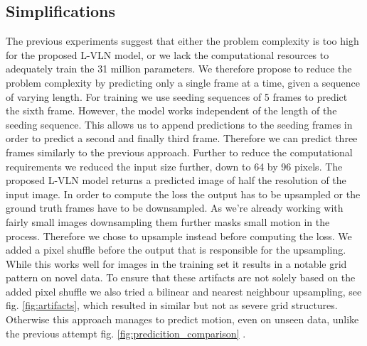 \documentclass[runningheads,a4paper]{llncs}
\begin{document}
\subsection{Simplifications}
The previous experiments suggest that either the problem complexity is too high for the proposed L-VLN model, or we lack the computational resources to adequately train the 31 million parameters. We therefore propose to reduce the problem complexity by predicting only a single frame at a time, given a sequence of varying length. For training we use seeding sequences of 5 frames to predict the sixth frame. However, the model works independent of the length of the seeding sequence. This allows us to append predictions to the seeding frames in order to predict a second and finally third frame. Therefore we can predict three frames similarly to the previous approach. Further to reduce the computational requirements we reduced the input size further, down to 64 by 96 pixels.
The proposed L-VLN model returns a predicted image of half the resolution of the input image. In order to compute the loss the output has to be upsampled or the ground truth frames have to be downsampled. As we’re already working with fairly small images downsampling them further masks small motion in the process. Therefore we chose to upsample instead before computing the loss. We added a pixel shuffle \citep{shi_real-time_2016} before the output that is responsible for the upsampling. While this works well for images in the training set it results in a notable grid pattern on novel data. To ensure that these artifacts are not solely based on the added pixel shuffle we also tried a bilinear and nearest neighbour upsampling, see fig. \ref{fig:artifacts}, which resulted in similar but not as severe grid structures. Otherwise this approach manages to predict motion, even on unseen data, unlike the previous attempt fig. \ref{fig:predicition_comparison} .
\end{document}
